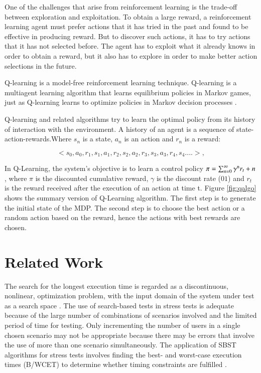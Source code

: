 \documentclass{bmcart}
\begin{document}
One of the challenges that arise from reinforcement learning is the trade-off between exploration and exploitation. To obtain a large reward, a reinforcement learning
agent must prefer actions that it has tried in the past and found to be effective in producing reward. But to discover such actions, it has to try actions that it has not selected before. The agent has to exploit what it already knows in order to obtain a reward, but it also has to explore in order to make better action selections in the future.

Q-learning is a model-free reinforcement learning technique. Q-learning is a multiagent learning algorithm that learns equilibrium policies in Markov games, just as Q-learning learns to optimize policies in Markov decision processes \citep{Greenwald2003}. 

Q-learning and related algorithms try to learn the optimal policy from its history of interaction with the environment. A history of an agent is a sequence of state-action-rewards.Where $s_{n}$ is a state, $a_{n}$ is an action and $r_{n}$ is a reward:

\begin{equation}
<s_{0},a_{0},r_{1},s_{1},a_{1},r_{2},s_{2},a_{2},r_{3},s_{3},a_{3},r_{4},s_{4}....>,
\end{equation}


In Q-Learning, the system's objective is to learn a control policy $\pi = \sum_{n=0}^{\infty} \gamma\textsuperscript{n}  r_{t}+n $, where $\pi$  is the discounted cumulative reward, $\gamma$ is the discount rate ($01$) and $r_{t}$ is the reward received after  the execution of an action at time t. Figure \ref{fig:qalgo} shows the summary version of Q-Learning algorithm. The first step is to generate the initial state of the MDP. The second step is to choose the best action or a random action based on the reward, hence the actions with best rewards are chosen.



\section{Related Work}

The search for the longest execution time is regarded as a discontinuous, nonlinear, optimization problem, with the input domain of the system under test as a search space \citep{Sullivan}.  The use of search-based tests in stress tests is adequate because of the large number of combinations of scenarios involved and the limited period of time for testing. Only incrementing the number of users in a single chosen scenario may not be appropriate because there may be errors that involve the use of more than one scenario simultaneously. The application of SBST algorithms for stress tests involves finding the best- and worst-case execution times (B/WCET) to determine whether timing constraints are fulfilled \citep{Afzal2009a}. 
\end{document}
